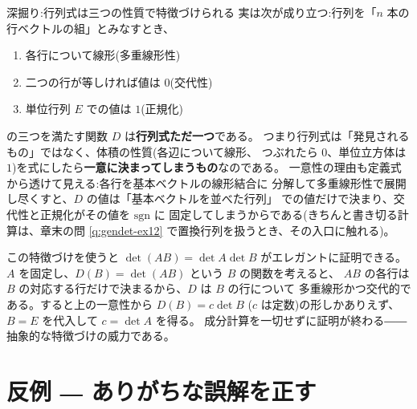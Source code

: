 \begin{itembox}[l]{深掘り:行列式は三つの性質で特徴づけられる}
実は次が成り立つ:行列を「$n$ 本の行ベクトルの組」とみなすとき、
\begin{enumerate}
\item 各行について線形(多重線形性)
\item 二つの行が等しければ値は $0$(交代性)
\item 単位行列 $E$ での値は $1$(正規化)
\end{enumerate}
の三つを満たす関数 $D$ は\textbf{行列式ただ一つ}である。
つまり行列式は「発見されるもの」ではなく、体積の性質(各辺について線形、
つぶれたら $0$、単位立方体は $1$)を式にしたら\textbf{一意に決まってしまうもの}なのである。
一意性の理由も定義式から透けて見える:各行を基本ベクトルの線形結合に
分解して多重線形性で展開し尽くすと、$D$ の値は「基本ベクトルを並べた行列」
での値だけで決まり、交代性と正規化がその値を $\mathrm{sgn}$ に
固定してしまうからである(きちんと書き切る計算は、章末の問
\ref{q:gendet-ex12} で置換行列を扱うとき、その入口に触れる)。

この特徴づけを使うと $\det(AB) = \det A \det B$ がエレガントに証明できる。
$A$ を固定し、$D(B) = \det(AB)$ という $B$ の関数を考えると、
$AB$ の各行は $B$ の対応する行だけで決まるから、$D$ は $B$ の行について
多重線形かつ交代的である。すると上の一意性から $D(B) = c \det B$
($c$ は定数)の形しかありえず、$B = E$ を代入して $c = \det A$ を得る。
成分計算を一切せずに証明が終わる――抽象的な特徴づけの威力である。
\end{itembox}

\section{反例 ― ありがちな誤解を正す}

